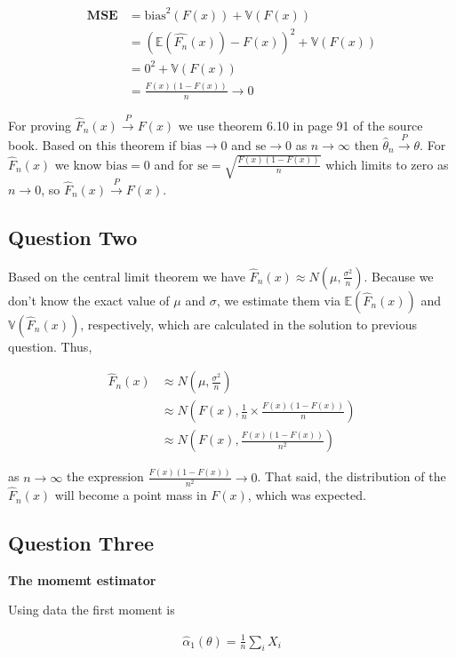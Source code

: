 \documentclass[12pt, a4paper]{book}
\begin{document}
\begin{align*}
    \mathbf{M} \mathbf{S} \mathbf{E} & = \text{bias}^2(F(x)) + \mathbb{V}(F(x)) \\
    & = (\mathbb{E}(\hat{F_n}(x)) - F(x))^2 + \mathbb{V}(F(x)) \\
    & = 0^2 + \mathbb{V}(F(x)) \\
    & = \frac{F(x)(1 - F(x))}{n} \rightarrow 0
\end{align*}

For proving $\hat{F}_n(x) \xrightarrow{P} F(x)$ we use theorem 6.10 in page 91 of the source book.
Based on this theorem if $\text{bias} \rightarrow 0$ and $\text{se} \rightarrow 0$ as $n \rightarrow \infty$
then $\hat{\theta}_n \xrightarrow{P} \theta$. For $\hat{F}_n{(x)}$ we know $\text{bias} = 0$ and for
$\text{se} = \sqrt{\frac{F(x)(1 - F(x))}{n}}$ which limits to zero as $n \rightarrow 0$, so $\hat{F}_n(x) \xrightarrow{P} F(x)$.

\subsection*{Question Two}

Based on the central limit theorem we have $\hat{F}_n(x) \approx N(\mu, \frac{\sigma^2}{n})$. Because
we don't know the exact value of $\mu$ and $\sigma$, we estimate them via $\mathbb{E}(\hat{F}_n(x))$ and
$\mathbb{V}(\hat{F}_n(x))$, respectively, which are calculated in the solution to previous question. Thus,

\begin{align*}
    \hat{F}_n(x) & \approx N( \mu, \frac{\sigma^2}{n}) \\
     & \approx N( F(x), \frac{1}{n} \times \frac{F(x)(1-F(x))}{n}) \\
     & \approx N( F(x), \frac{F(x)(1-F(x))}{n^2})
\end{align*}

as $n \rightarrow \infty$ the expression $\frac{F(x)(1-F(x))}{n^2} \rightarrow 0$. That said,
the distribution of the $\hat{F}_n(x)$ will become a point mass in $F(x)$, which was expected.

\subsection*{Question Three}

\textbf{The momemt estimator}

Using data the first moment is

\begin{align*}
    \hat{\alpha}_1(\theta) = \frac{1}{n} \sum_i X_i
\end{align*}
\end{document}
